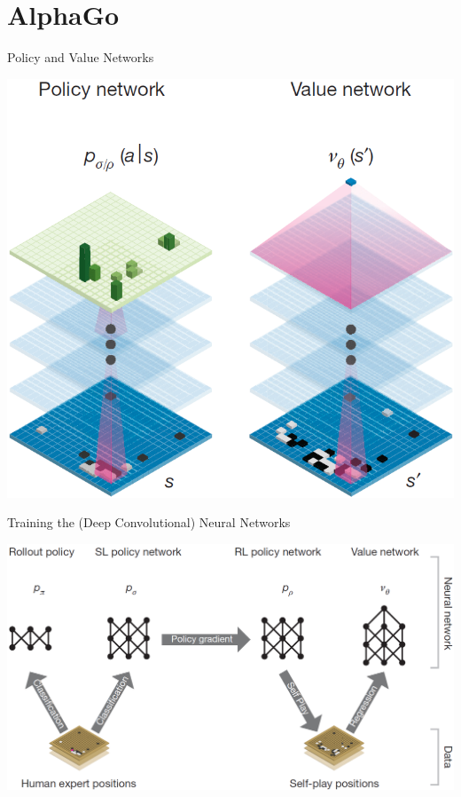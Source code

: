 \documentclass{beamer}
\begin{document}
  \section{AlphaGo}
  {

    \begin{frame}{Policy and Value Networks}
      \begin{center}
        \includegraphics[height=.85\textheight]{../img/policy_and_value_network.png}
      \end{center}
    \end{frame}

    \begin{frame}{Training the (Deep Convolutional) Neural Networks}
      \begin{center}
        \includegraphics[width=\textwidth]{../img/neural_nets_pipeline.png}
      \end{center}
    \end{frame}
  }
\end{document}
